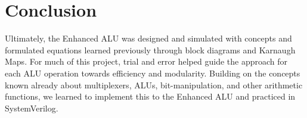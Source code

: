 \documentclass{article}
\begin{document}
\section{Conclusion}
Ultimately, the Enhanced ALU was designed and simulated with concepts and formulated equations learned previously through block diagrams and Karnaugh Maps. For much of this project, trial and error helped guide the approach for each ALU operation towards efficiency and modularity. Building on the concepts known already about multiplexers, ALUs, bit-manipulation, and other arithmetic functions, we learned to implement this to the Enhanced ALU and practiced in SystemVerilog.
\end{document}

